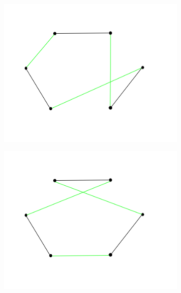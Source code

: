\begin{figure}[h!]
\begin{subfigure}[b]{0.24\linewidth}
    \caption{}
  \end{subfigure}
  \begin{subfigure}[b]{0.24\linewidth}
    \includegraphics[width=\linewidth]{media/3opt3.png}
    \caption{}
  \end{subfigure}
  \begin{subfigure}[b]{0.24\linewidth}
    \includegraphics[width=\linewidth]{media/3opt4.png}
    \caption{}
  \end{subfigure}
  \begin{subfigure}[b]{0.24\linewidth}

\end{subfigure}
\end{figure}
